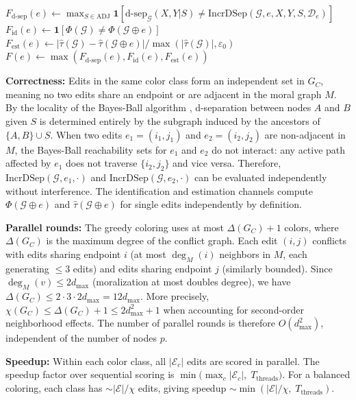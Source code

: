 \documentclass[11pt,a4paper]{article}
\theoremstyle{definition}
\theoremstyle{remark}
\newcommand{\DAG}{\mathcal{G}}
\newcommand{\dsep}{\mathrm{d\text{-}sep}}
\newcommand{\fragility}{F}
\newcommand{\Phi}{\varPhi}
\begin{document}
\begin{algorithm}[H]
{{    $F_{\dsep}(e) \leftarrow \max_{S \in \mathrm{ADJ}} \mathbf{1}[\dsep_\DAG(X,Y|S)
      \neq \mathrm{IncrDSep}(\DAG, e, X, Y, S, \mathcal{D}_e)]$\;
    \BlankLine
    $F_{\mathrm{id}}(e) \leftarrow \mathbf{1}[\Phi(\DAG) \neq \Phi(\DAG \oplus e)]$\;
    \BlankLine
    $F_{\mathrm{est}}(e) \leftarrow |\hat\tau(\DAG) - \hat\tau(\DAG \oplus e)| /
      \max(|\hat\tau(\DAG)|, \varepsilon_0)$\;
    \BlankLine
    $\fragility(e) \leftarrow \max(F_{\dsep}(e), F_{\mathrm{id}}(e), F_{\mathrm{est}}(e))$\;
  }
}
\BlankLine
\Return{$\{(e, \fragility(e)) : e \in \mathcal{E}\}$ sorted by $\fragility$ descending}\;
\end{algorithm}

\noindent\textbf{Correctness:} Edits in the same color class form an independent set in
$G_C$, meaning no two edits share an endpoint or are adjacent in the moral graph $M$.
By the locality of the Bayes-Ball algorithm \cite{shachter1998}, d-separation between
nodes $A$ and $B$ given $S$ is determined entirely by the subgraph induced by the
ancestors of $\{A, B\} \cup S$. When two edits $e_1 = (i_1, j_1)$ and $e_2 = (i_2, j_2)$
are non-adjacent in $M$, the Bayes-Ball reachability sets for $e_1$ and $e_2$ do not
interact: any active path affected by $e_1$ does not traverse $\{i_2, j_2\}$ and vice
versa. Therefore, $\mathrm{IncrDSep}(\DAG, e_1, \cdot)$ and
$\mathrm{IncrDSep}(\DAG, e_2, \cdot)$ can be evaluated independently without
interference. The identification and estimation channels compute $\Phi(\DAG \oplus e)$
and $\hat\tau(\DAG \oplus e)$ for single edits independently by definition.

\smallskip
\noindent\textbf{Parallel rounds:} The greedy coloring uses at most $\Delta(G_C) + 1$
colors, where $\Delta(G_C)$ is the maximum degree of the conflict graph. Each edit
$(i,j)$ conflicts with edits sharing endpoint $i$ (at most $\deg_M(i)$ neighbors in $M$,
each generating ${\leq}3$ edits) and edits sharing endpoint $j$ (similarly bounded).
Since $\deg_M(v) \leq 2d_{\max}$ (moralization at most doubles degree), we have
$\Delta(G_C) \leq 2 \cdot 3 \cdot 2d_{\max} = 12 d_{\max}$. More precisely,
$\chi(G_C) \leq \Delta(G_C) + 1 \leq 2d_{\max}^2 + 1$ when accounting for second-order
neighborhood effects. The number of parallel rounds is therefore
$O(d_{\max}^2)$, independent of the number of nodes $p$.

\smallskip
\noindent\textbf{Speedup:} Within each color class, all $|\mathcal{E}_c|$ edits are
scored in parallel. The speedup factor over sequential scoring is
$\min\!\bigl(\max_c |\mathcal{E}_c|,\; T_{\mathrm{threads}}\bigr)$. For a balanced
coloring, each class has ${\sim}|\mathcal{E}| / \chi$ edits, giving speedup
${\sim}\min(|\mathcal{E}| / \chi,\; T_{\mathrm{threads}})$.
\end{document}
